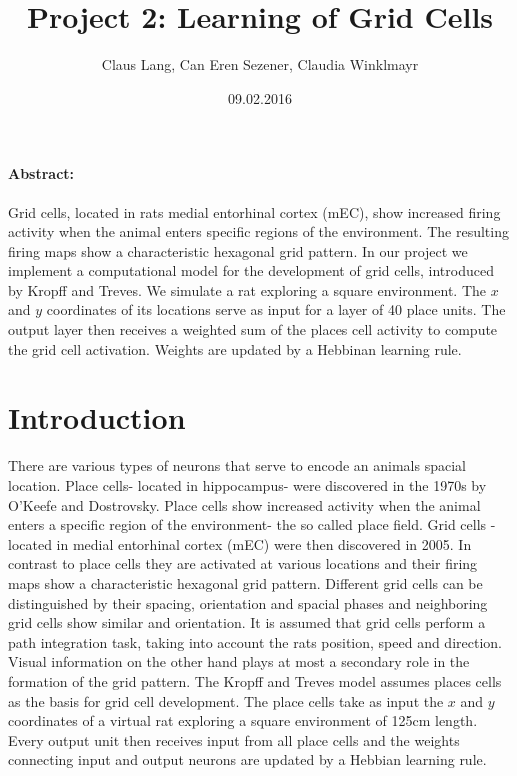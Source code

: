 \documentclass[a4paper, 12pt]{article}
\title{Project 2: Learning of Grid Cells}
\author{Claus Lang, Can Eren Sezener, Claudia Winklmayr}
\date{09.02.2016}
\begin{document}
\maketitle

\paragraph{Abstract:}
Grid cells, located in rats medial entorhinal cortex (mEC), show increased firing activity when the animal enters specific regions of the environment. The resulting firing maps show a characteristic hexagonal grid pattern. In our project we implement a computational model for the development of grid cells, introduced by Kropff and Treves. We simulate a rat exploring a square environment. The $x$ and $y$ coordinates of its locations serve as input for a layer of 40 place units. The output layer then receives a weighted sum of the places cell activity to compute the grid cell activation. Weights are updated by a Hebbinan learning rule. 

\section{Introduction}
There are various types of neurons that serve to encode an animals spacial location. Place cells- located in hippocampus- were discovered in the 1970s by O'Keefe and Dostrovsky. Place cells show increased activity when the animal enters a specific region of the environment- the so called place field.\newline
Grid cells - located in medial entorhinal cortex (mEC) were then discovered in 2005. In contrast to place cells they are activated at various locations and their firing maps show a characteristic hexagonal grid pattern. Different grid cells can be distinguished by their spacing, orientation and spacial phases and neighboring grid cells show similar and orientation. \newline
It is assumed that grid cells perform a path integration task, taking into account the rats position, speed and direction. Visual information on the other hand plays at most a secondary role in the formation of the grid pattern. \newline
The Kropff and Treves model assumes places cells as the basis for grid cell development. The place cells take as input the $x$ and $y$ coordinates of a virtual rat exploring a square environment of 125cm length. Every output unit then receives input from all place cells and the weights connecting input and output neurons are updated by a Hebbian learning rule. 
%
%
%
\end{document}
